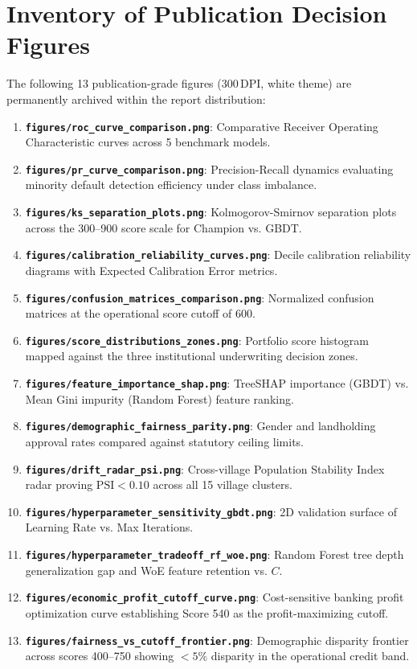 \documentclass[11pt,a4paper,oneside]{report}
\begin{document}
\section{Inventory of Publication Decision Figures}
The following 13 publication-grade figures (300\,DPI, white theme) are permanently archived within the report distribution:
\begin{enumerate}
  \item \textbf{\texttt{figures/roc\_curve\_comparison.png}}: Comparative Receiver Operating Characteristic curves across 5 benchmark models.
  \item \textbf{\texttt{figures/pr\_curve\_comparison.png}}: Precision-Recall dynamics evaluating minority default detection efficiency under class imbalance.
  \item \textbf{\texttt{figures/ks\_separation\_plots.png}}: Kolmogorov-Smirnov separation plots across the 300--900 score scale for Champion vs. GBDT.
  \item \textbf{\texttt{figures/calibration\_reliability\_curves.png}}: Decile calibration reliability diagrams with Expected Calibration Error metrics.
  \item \textbf{\texttt{figures/confusion\_matrices\_comparison.png}}: Normalized confusion matrices at the operational score cutoff of 600.
  \item \textbf{\texttt{figures/score\_distributions\_zones.png}}: Portfolio score histogram mapped against the three institutional underwriting decision zones.
  \item \textbf{\texttt{figures/feature\_importance\_shap.png}}: TreeSHAP importance (GBDT) vs. Mean Gini impurity (Random Forest) feature ranking.
  \item \textbf{\texttt{figures/demographic\_fairness\_parity.png}}: Gender and landholding approval rates compared against statutory ceiling limits.
  \item \textbf{\texttt{figures/drift\_radar\_psi.png}}: Cross-village Population Stability Index radar proving $\text{PSI} < 0.10$ across all 15 village clusters.
  \item \textbf{\texttt{figures/hyperparameter\_sensitivity\_gbdt.png}}: 2D validation surface of Learning Rate vs. Max Iterations.
  \item \textbf{\texttt{figures/hyperparameter\_tradeoff\_rf\_woe.png}}: Random Forest tree depth generalization gap and WoE feature retention vs. $C$.
  \item \textbf{\texttt{figures/economic\_profit\_cutoff\_curve.png}}: Cost-sensitive banking profit optimization curve establishing Score 540 as the profit-maximizing cutoff.
  \item \textbf{\texttt{figures/fairness\_vs\_cutoff\_frontier.png}}: Demographic disparity frontier across scores 400--750 showing $<5\%$ disparity in the operational credit band.
\end{enumerate}

\end{document}
